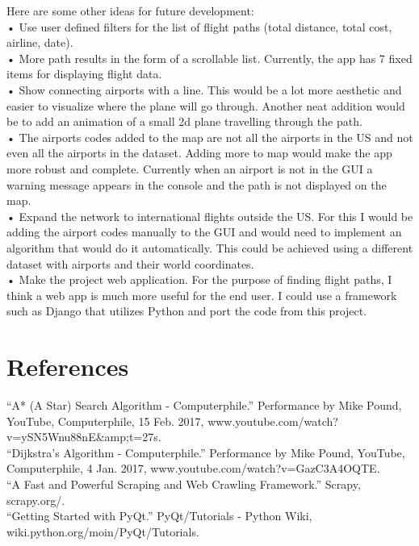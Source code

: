 \documentclass[fontsize=11pt]{article}
\begin{document}
\noindent
Here are some other ideas for future development:\\

\noindent
• Use user defined filters for the list of flight paths (total distance, total cost, airline, date).\\
• More path results in the form of a scrollable list. Currently, the app has 7 fixed items for displaying flight data.\\
• Show connecting airports with a line. This would be a lot more aesthetic and easier to visualize where the plane will go through. Another neat addition would be to add an animation of a small 2d plane travelling through the path.\\
• The airports codes added to the map are not all the airports in the US and not even all the airports in the dataset. Adding more to map would make the app more robust and complete. Currently when an airport is not in the GUI a warning message appears in the console and the path is not displayed on the map.\\
• Expand the network to international flights outside the US. For this I would be adding the airport codes manually to the GUI and would need to implement an algorithm that would do it automatically. This could be achieved using a different dataset with airports and their world coordinates.\\
• Make the project web application. For the purpose of finding flight paths, I think a web app is much more useful for the end user. I could use a framework such as Django that utilizes Python and port the code from this project.


\section*{References}

\noindent
“A* (A Star) Search Algorithm - Computerphile.” Performance by Mike Pound, YouTube, Computerphile, 15 Feb. 2017, www.youtube.com/watch?v=ySN5Wnu88nE&amp;t=27s.\\

\noindent
“Dijkstra's Algorithm - Computerphile.” Performance by Mike Pound, YouTube, Computerphile, 4 Jan. 2017, www.youtube.com/watch?v=GazC3A4OQTE.\\

\noindent
“A Fast and Powerful Scraping and Web Crawling Framework.” Scrapy, scrapy.org/.\\

\noindent
“Getting Started with PyQt.” PyQt/Tutorials - Python Wiki, wiki.python.org/moin/PyQt/Tutorials.\\
\end{document}

